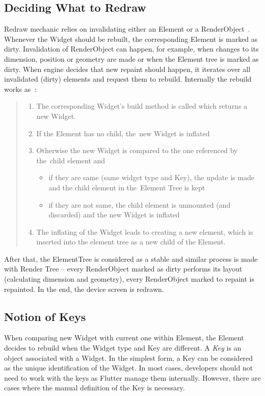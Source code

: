 \subsection{Deciding What to Redraw}
Redraw mechanic relies on invalidating either an Element or a RenderObject~\cite{didier-internals}.  Whenever the Widget should be rebuilt, the corresponding Element is marked as dirty. Invalidation of RenderObject can happen, for example, when changes to its dimension, position or geometry are made or when the Element tree is marked as dirty. When engine decides that new repaint should happen, it iterates over all invalidated (dirty) elements and request them to rebuild. Internally the rebuild works as~\cite{didier-internals}:
\begin{quote}
    \begin{enumerate}
    \item The corresponding Widget's build method is called which returns a new Widget.
    \item If the Element has no child, the~new Widget is inflated
    \item Otherwise the new Widget is compared to the one referenced by the~child element and
        \begin{itemize}
        \item if they are same (same widget type and Key), the update is made and the child element in the~Element Tree is kept
        \item if they are not same, the child element is unmounted (and discarded) and the new Widget is inflated
        \end{itemize}
    \item The inflating of the Widget leads to creating a new element, which is inserted into the element tree as a new child of the Element. 
    \end{enumerate}
\end{quote}


After that, the ElementTree is considered as a stable and similar process is made with Render Tree -- every RenderObject marked as dirty performs its layout (calculating dimension and geometry), every RenderObject marked to repaint is repainted. In the end, the device screen is redrawn. 
\subsection{Notion of Keys}
When comparing new Widget with current one within Element, the Element decides to rebuild when the Widget type and Key are different. A \textit{Key} is an object associated with a Widget. In the simplest form, a Key can be considered as the unique identification of the Widget. In most cases, developers should not need to work with the keys as Flutter manage them internally. However, there are cases where the manual definition of the Key is necessary. 

